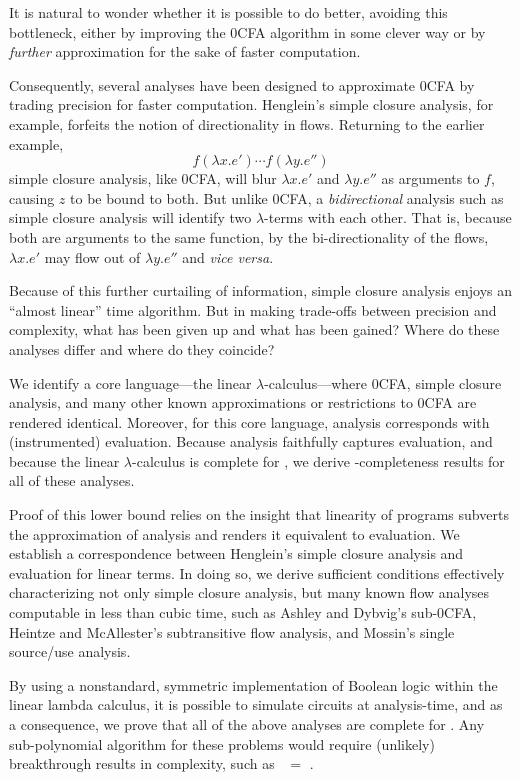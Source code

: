It is natural to wonder whether it is possible to do better, avoiding
this bottleneck, either by improving the 0CFA algorithm in some clever
way or by {\em further} approximation for the sake of faster
computation.

Consequently, several analyses have been designed to approximate 0CFA
by trading precision for faster computation.  Henglein's simple
closure analysis, for example, forfeits the notion of directionality
in flows.  Returning to the earlier example,
\begin{displaymath}
f(\lambda x.e') \cdots f (\lambda y.e'')
\end{displaymath}
simple closure analysis, like 0CFA, will blur $\lambda x.e'$ and
$\lambda y.e''$ as arguments to $f$, causing $z$ to be bound to both.
But unlike 0CFA, a {\em bidirectional} analysis such as simple closure
analysis will identify two $\lambda$-terms with each other.  That is,
because both are arguments to the same function, by the
bi-directionality of the flows, $\lambda x.e'$ may flow out of $\lambda
y.e''$ and {\em vice versa}.

Because of this further curtailing of information, simple closure
analysis enjoys an ``almost linear'' time algorithm.  But in making
trade-offs between precision and complexity, what has been given up
and what has been gained?  Where do these analyses differ and where do
they coincide?

We identify a core language---the linear $\lambda$-calculus---where
0CFA, simple closure analysis, and many other known approximations or
restrictions to 0CFA are rendered identical.  Moreover, for this core
language, analysis corresponds with (instrumented) evaluation.
Because analysis faithfully captures evaluation, and because the
linear $\lambda$-calculus is complete for \ptime, we derive
\ptime-completeness results for all of these analyses.

Proof of this lower bound relies on the insight that linearity of
programs subverts the approximation of analysis and renders it
equivalent to evaluation.  We establish a correspondence between
Henglein's simple closure analysis and evaluation for linear terms.
In doing so, we derive sufficient conditions effectively
characterizing not only simple closure analysis, but many known flow
analyses computable in less than cubic time, such as Ashley and
Dybvig's sub-0CFA, Heintze and McAllester's subtransitive flow
analysis, and Mossin's single source/use analysis.

By using a nonstandard, symmetric implementation of Boolean logic
within the linear lambda calculus, it is possible to simulate circuits
at analysis-time, and as a consequence, we prove that all of the above
analyses are complete for \ptime.  Any sub-polynomial algorithm for
these problems would require (unlikely) breakthrough results in
complexity, such as \ptime\ $=$ \logspace.

